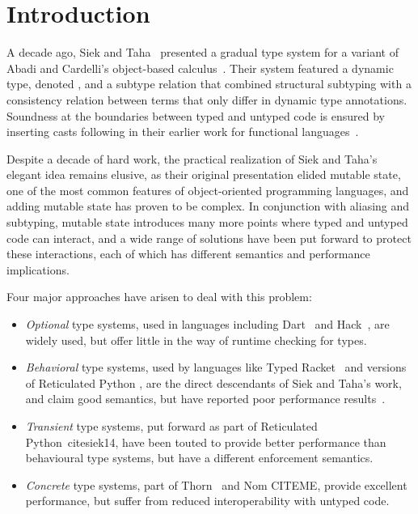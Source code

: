\documentclass[a4paper,USenglish]{tex/lipics-v2016}
\begin{document}
\section{Introduction}


\noindent A decade ago, Siek and Taha~\cite{SiekTaha07} presented a gradual
type system for a variant of Abadi and Cardelli's object-based
calculus~\cite{cardelli:1996:theory-of-objects}. Their system featured a
dynamic type, denoted \any, and a subtype relation that combined structural
subtyping with a consistency relation between terms that only differ in
dynamic type annotations.  Soundness at the boundaries between typed and
untyped code is ensured by inserting casts following in their earlier work for
functional languages~\cite{SiekTaha06}.

Despite a decade of hard work, the practical realization of Siek and Taha's
elegant idea remains elusive, as their original presentation elided mutable
state, one of the most common features of object-oriented programming
languages, and adding mutable state has proven to be complex. In conjunction
with aliasing and subtyping, mutable state introduces many more points where
typed and untyped code can interact, and a wide range of solutions have been
put forward to protect these interactions, each of which has different
semantics and performance implications.

Four major approaches have arisen to deal with this problem:
\begin{itemize}

\item \emph{Optional} type systems, used in languages including
Dart~\cite{dart13} and Hack~\cite{hack13}, are widely used, but offer little
in the way of runtime checking for types.

\item \emph{Behavioral} type systems, used by languages like Typed
Racket~\cite{Takikawa:2012,sth10} and versions of Reticulated Python
\cite{siek14}, are the direct descendants of Siek and Taha's work,
and claim good semantics, but have reported poor performance 
results~\cite{practical-gt}.

\item \emph{Transient} type systems, put forward as part of Reticulated
Python~cite{siek14}, have been touted to provide better performance than
behavioural type systems, but have a different enforcement semantics.

\item \emph{Concrete} type systems, part of Thorn~\cite{oopsla09} and Nom
CITEME, provide excellent performance, but suffer from reduced
interoperability with untyped code.

\end{itemize}
\end{document}

